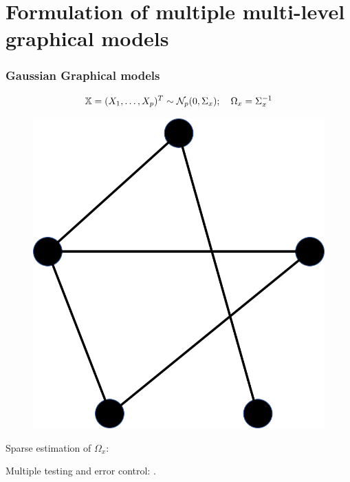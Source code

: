 \documentclass[10pt]{beamer}
\theoremstyle{definition}
\begin{document}
\section{Formulation of multiple multi-level graphical models}

\begin{frame}
\frametitle{Gaussian Graphical models}

\[
{\mathbb{X}} = (X_1, \ldots, X_p)^T \sim {\cal{N}}_p (0, \Sigma_x); \quad
\Omega_x = \Sigma_x^{-1}
\]

\begin{figure}
\centering
\includegraphics[width=.4\textwidth]{formulation_2}
\end{figure}

Sparse estimation of $\Omega_x$: {\colr \cite{MeisenBuhlmann06}}

Multiple testing and error control: {\colr \cite{DrtonPerlman07}}.

\end{frame}
\end{document}
